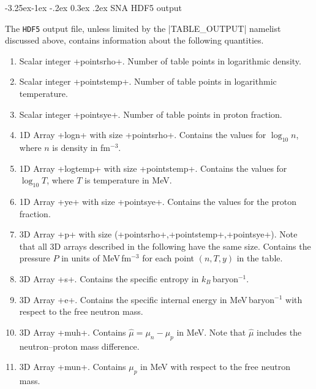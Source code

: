 \documentclass[letterpaper,11pt]{refart}
\makeatletter
\renewcommand\subsubsection{\@startsection{subsubsection}{3}{\z@}%
                           {-3.25ex\@plus -1ex \@minus -.2ex}%
                           {0.3ex \@plus .2ex}%
                           {\normalfont\normalsize\bf\fontsize{11}{13}\selectfont}}
\makeatother
\begin{document}
\subsubsection{SNA HDF5 output}\label{sssec:SNA_HDF5}


The \verb|HDF5| output file, unless limited by the \verbnml|TABLE_OUTPUT| namelist discussed above, contains information about the following quantities.
\begin{enumerate}
 \item Scalar integer \verbprm+pointsrho+. Number of table points in
   logarithmic density.

 \item Scalar integer \verbprm+pointstemp+. Number of table points in
   logarithmic temperature.

 \item Scalar integer \verbprm+pointsye+. Number of table points in
   proton fraction.

 \item 1D Array
   \verbprm+logn+ with size \verbprm+pointsrho+. Contains the values for
   $\log_{10}n$, where $n$ is density in fm$^{-3}$.

 \item 1D Array \verbprm+logtemp+ with size
   \verbprm+pointstemp+. Contains the values for $\log_{10}T$, where
   $T$ is temperature in MeV.

 \item 1D Array \verbprm+ye+ with size \verbprm+pointsye+. Contains
   the values for the proton fraction.
   
 \item 3D Array \verbprm+p+ with size
   (\verbprm+pointsrho+,\verbprm+pointstemp+,\verbprm+pointsye+). Note
   that all 3D arrays described in the following have the same
   size. Contains the pressure $P$ in units of MeV\,fm$^{-3}$ for each
   point $(n,T,y)$ in the table.

 \item 3D Array \verbprm+s+. Contains the specific entropy in
   $k_B$\,baryon$^{-1}$.

 \item 3D Array \verbprm+e+. Contains the specific internal energy in
   MeV\,baryon$^{-1}$ with respect to the free neutron mass.

 \item 3D Array \verbprm+muh+. Contains $\hat\mu=\mu_n-\mu_p$ in MeV. 
   Note that $\hat\mu$ includes the neutron--proton mass difference.
   
 \item 3D Array \verbprm+mun+. Contains $\mu_p$ in MeV with respect to the
   free neutron mass.


\end{enumerate}
\end{document}
